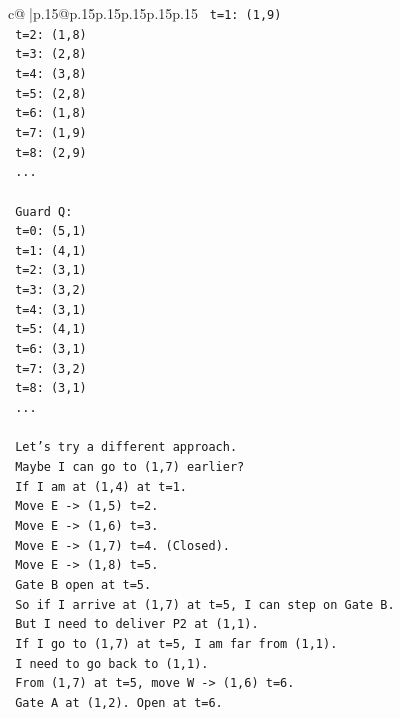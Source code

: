 \documentclass{article}
\begin{document}
{\begin{supertabular}{c@{$\;$}|p{.15\linewidth}@{}p{.15\linewidth}p{.15\linewidth}p{.15\linewidth}p{.15\linewidth}p{.15\linewidth}}
{{{\texttt{   t=1: (1,9)} \\
\texttt{   t=2: (1,8)} \\
\texttt{   t=3: (2,8)} \\
\texttt{   t=4: (3,8)} \\
\texttt{   t=5: (2,8)} \\
\texttt{   t=6: (1,8)} \\
\texttt{   t=7: (1,9)} \\
\texttt{   t=8: (2,9)} \\
\texttt{   ...} \\
\\ 
\texttt{   Guard Q:} \\
\texttt{   t=0: (5,1)} \\
\texttt{   t=1: (4,1)} \\
\texttt{   t=2: (3,1)} \\
\texttt{   t=3: (3,2)} \\
\texttt{   t=4: (3,1)} \\
\texttt{   t=5: (4,1)} \\
\texttt{   t=6: (3,1)} \\
\texttt{   t=7: (3,2)} \\
\texttt{   t=8: (3,1)} \\
\texttt{   ...} \\
\\ 
\texttt{   Let's try a different approach.} \\
\texttt{   Maybe I can go to (1,7) earlier?} \\
\texttt{   If I am at (1,4) at t=1.} \\
\texttt{   Move E {-}> (1,5) t=2.} \\
\texttt{   Move E {-}> (1,6) t=3.} \\
\texttt{   Move E {-}> (1,7) t=4. (Closed).} \\
\texttt{   Move E {-}> (1,8) t=5.} \\
\texttt{   Gate B open at t=5.} \\
\texttt{   So if I arrive at (1,7) at t=5, I can step on Gate B.} \\
\texttt{   But I need to deliver P2 at (1,1).} \\
\texttt{   If I go to (1,7) at t=5, I am far from (1,1).} \\
\texttt{   I need to go back to (1,1).} \\
\texttt{   From (1,7) at t=5, move W {-}> (1,6) t=6.} \\
\texttt{   Gate A at (1,2). Open at t=6.} \\
}}}
\end{supertabular}}
\end{document}
